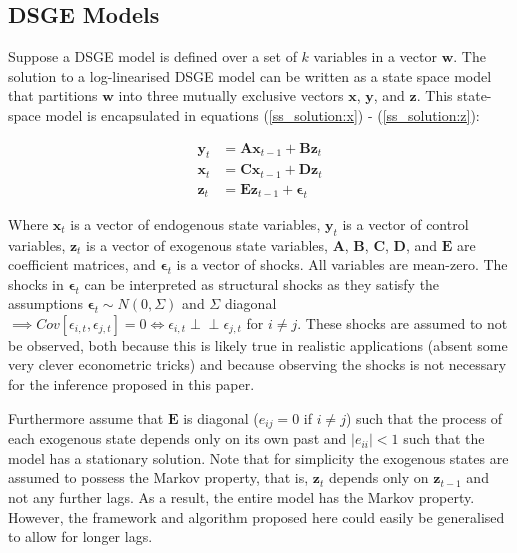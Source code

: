 \documentclass{article}
\def\indep{\perp \!\!\! \perp}
\begin{document}
\subsection{DSGE Models} \label{dsge}

Suppose a DSGE model is defined over a set of $k$ variables in a vector $\mathbf{w}$. The solution to a log-linearised DSGE model can be written as a state space model \parencite{king1988production} that partitions $\mathbf{w}$ into three mutually exclusive vectors $\mathbf{x}$, $\mathbf{y}$, and $\mathbf{z}$. This state-space model is encapsulated in equations (\ref{ss_solution:x}) - (\ref{ss_solution:z}):

\begin{align}
  \mathbf{y}_t &= \mathbf{A} \mathbf{x}_{t-1} + \mathbf{B} \mathbf{z}_{t} \label{ss_solution:x}\\
  \mathbf{x}_t &= \mathbf{C} \mathbf{x}_{t-1} + \mathbf{D} \mathbf{z}_{t} \label{ss_solution:y}\\
  \mathbf{z}_t &= \mathbf{E} \mathbf{z}_{t-1} + \mathbf{\epsilon}_{t} \label{ss_solution:z}
\end{align}

Where $\mathbf{x}_t$ is a vector of endogenous state variables, $\mathbf{y}_t$ is a vector of control variables, $\mathbf{z}_t$ is a vector of exogenous state variables, $\mathbf{A}$, $\mathbf{B}$, $\mathbf{C}$, $\mathbf{D}$, and $\mathbf{E}$ are coefficient matrices, and $\mathbf{\epsilon}_t$ is a vector of shocks. All variables are mean-zero. The shocks in $\mathbf{\epsilon}_t$ can be interpreted as structural shocks as they satisfy the assumptions $\mathbf{\epsilon}_{t} \sim N(0,\Sigma)$ and $\Sigma$ diagonal $\implies Cov[\epsilon_{i,t},\epsilon_{j,t}] = 0 \iff \epsilon_{i,t} \indep \epsilon_{j,t} $ for $i \not = j$. These shocks are assumed to not be observed, both because this is likely true in realistic applications (absent some very clever econometric tricks) and because observing the shocks is not necessary for the inference proposed in this paper.

Furthermore assume that $\mathbf{E}$ is diagonal ($e_{ij} = 0$ if $i \not = j$) such that the process of each exogenous state depends only on its own past and $|e_{ii}| < 1$ such that the model has a stationary solution. Note that for simplicity the exogenous states are assumed to possess the Markov property, that is, $\mathbf{z}_t$ depends only on $\mathbf{z}_{t-1}$ and not any further lags. As a result, the entire model has the Markov property. However, the framework and algorithm proposed here could easily be generalised to allow for longer lags.
\end{document}
